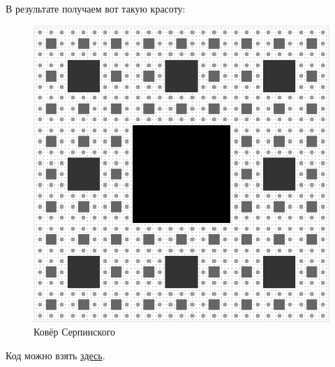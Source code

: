 В результате получаем вот такую красоту:

\begin{figure}[h]
    \center
    \includegraphics[width=.5\textwidth]{2015-09-06-sierpinski-carpet-and-shader-sierpinski.png}
    \caption{Ковёр Серпинского}
\end{figure}

Код можно взять \href{https://github.com/citrux/sierpinski-carpet}{здесь}.

